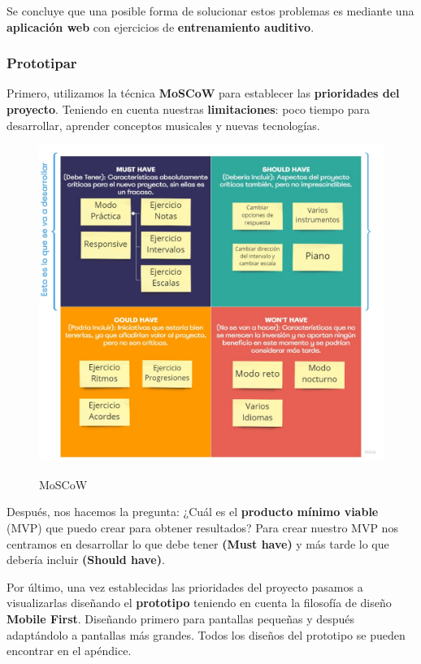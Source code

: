 \documentclass[12pt,twoside,titlepage]{report}
\begin{document}
Se concluye que una posible forma de solucionar estos problemas es mediante una \textbf{aplicación web} con ejercicios de \textbf{entrenamiento auditivo}. 


\subsubsection{Prototipar}

Primero, utilizamos la técnica \textbf{MoSCoW} para establecer las \textbf{prioridades del proyecto}. Teniendo en cuenta nuestras \textbf{limitaciones}: poco tiempo para desarrollar, aprender conceptos musicales y nuevas tecnologías. 

\begin{figure}[H]
    \centering
    \includegraphics[scale=0.35]{Design Thinking/MosCow}
    \label{fig:MoSCoW}
    \caption{MoSCoW}
\end{figure}

Después, nos hacemos la pregunta: ¿Cuál es el \textbf{producto mínimo viable} (MVP) que puedo crear para obtener resultados? Para crear nuestro MVP nos centramos en desarrollar lo que debe tener \textbf{(Must have)} y más tarde lo que debería incluir \textbf{(Should have)}.

Por último, una vez establecidas las prioridades del proyecto pasamos a visualizarlas diseñando el \textbf{prototipo} teniendo en cuenta la filosofía de diseño \textbf{Mobile First}. Diseñando primero para pantallas pequeñas y después adaptándolo a pantallas más grandes. Todos los diseños del prototipo se pueden encontrar en el apéndice.
    
\end{document}

